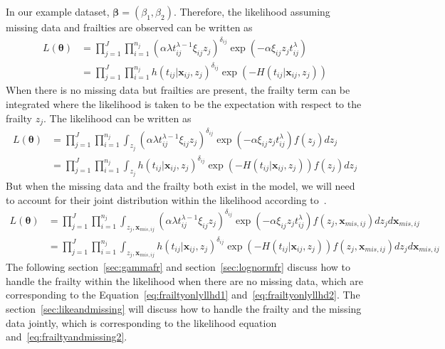 \documentclass[preprint,12pt]{elsarticle}
\begin{document}
In our example dataset, $\boldsymbol{\beta}=(\beta_1, \beta_2)$. 
Therefore, the likelihood assuming missing data and frailties are observed can be written as
\begin{align}
    L(\boldsymbol{\theta})&=\prod_{j=1}^J\prod_{i=1}^{n_j}(\alpha\lambda t_{ij}^{\lambda-1}\xi_{ij}z_j)^{\delta_{ij}}\exp(-\alpha\xi_{ij}z_j t_{ij}^{\lambda})\\
    &=\prod_{j=1}^J\prod_{i=1}^{n_j}h(t_{ij}|\mathbf{x}_{ij},z_j)^{\delta_{ij}}\exp(-H(t_{ij}|\mathbf{x}_{ij},z_j))
\end{align}
When there is no missing data but frailties are present, the frailty term can be integrated where the likelihood is taken to be the expectation with respect to the frailty $z_j$. 
The likelihood can be written as 
\begin{align}
    L(\boldsymbol{\theta})&=\prod_{j=1}^J\prod_{i=1}^{n_j}\int_{z_j}(\alpha\lambda t_{ij}^{\lambda-1}\xi_{ij}z_j)^{\delta_{ij}}\exp(-\alpha\xi_{ij}z_j t_{ij}^{\lambda})f(z_j)dz_j\label{eq:frailtyonlyllhd1}\\
    &=\prod_{j=1}^J\prod_{i=1}^{n_j}\int_{z_j}h(t_{ij}|\mathbf{x}_{ij},z_j)^{\delta_{ij}}\exp(-H(t_{ij}|\mathbf{x}_{ij},z_j))f(z_j)dz_j\label{eq:frailtyonlyllhd2}
\end{align}
But when the missing data and the frailty both exist in the model, we will need to account for their joint distribution within the likelihood according to~\citet{herring2002frailty}. 
\begin{align} 
    L(\boldsymbol{\theta})&=\prod_{j=1}^J\prod_{i=1}^{n_j}\int_{z_j,\mathbf{x}_{mis,ij}}(\alpha\lambda t_{ij}^{\lambda-1}\xi_{ij}z_j)^{\delta_{ij}}\exp(-\alpha\xi_{ij}z_j t_{ij}^{\lambda})f(z_j, \mathbf{x}_{mis,ij})dz_jd\mathbf{x}_{mis,ij}\label{eq:frailtyandmissing1}\\
    &=\prod_{j=1}^J\prod_{i=1}^{n_j}\int_{z_j,\mathbf{x}_{mis,ij}}h(t_{ij}|\mathbf{x}_{ij},z_j)^{\delta_{ij}}\exp(-H(t_{ij}|\mathbf{x}_{ij},z_j))f(z_j, \mathbf{x}_{mis,ij})dz_jd\mathbf{x}_{mis,ij}\label{eq:frailtyandmissing2}
\end{align}
The following section~\ref{sec:gammafr} and section~\ref{sec:lognormfr} discuss how to handle the frailty within the likelihood when there are no missing data, which are corresponding to the Equation~\ref{eq:frailtyonlyllhd1} and~\ref{eq:frailtyonlyllhd2}. 
The section~\ref{sec:likeandmissing} will discuss how to handle the frailty and the missing data jointly, which is corresponding to the likelihood equation~\label{eq:frailtyandmissing1} and~\ref{eq:frailtyandmissing2}.
\end{document}
